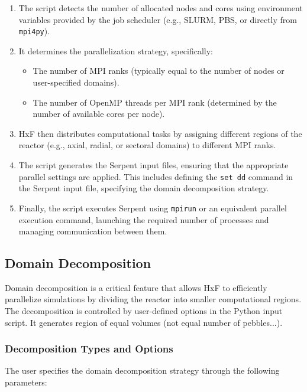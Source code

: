 \documentclass{article}
\begin{document}
\begin{enumerate}
    \item The script detects the number of allocated nodes and cores using environment variables provided by the job scheduler (e.g., SLURM, PBS, or directly from \texttt{mpi4py}).
    \item It determines the parallelization strategy, specifically:
    \begin{itemize}
        \item The number of MPI ranks (typically equal to the number of nodes or user-specified domains).
        \item The number of OpenMP threads per MPI rank (determined by the number of available cores per node).
    \end{itemize}
    \item HxF then distributes computational tasks by assigning different regions of the reactor (e.g., axial, radial, or sectoral domains) to different MPI ranks.
    \item The script generates the Serpent input files, ensuring that the appropriate parallel settings are applied. This includes defining the \texttt{set dd} command in the Serpent input file, specifying the domain decomposition strategy.
    \item Finally, the script executes Serpent using \texttt{mpirun} or an equivalent parallel execution command, launching the required number of processes and managing communication between them.
\end{enumerate}

\subsection{Domain Decomposition}\label{sec:dd}

Domain decomposition is a critical feature that allows HxF to efficiently parallelize simulations by dividing the reactor into smaller computational regions. The decomposition is controlled by user-defined options in the Python input script. It generates region of equal volumes (not equal number of pebbles...).

\subsubsection{Decomposition Types and Options}

The user specifies the domain decomposition strategy through the following parameters:
\end{document}
